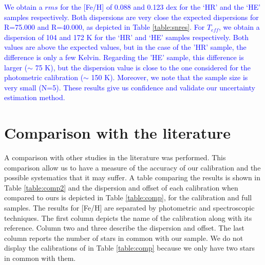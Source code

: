 \documentclass{aa}
\begin{document}
\textcolor{blue}{We obtain a $rms$ for the [Fe/H] of 0.088 and 0.123 dex for the `HR' and the `HE' samples respectively. Both dispersions are very close the expected dispersions for R=75.000 and R=40.000, as depicted in Table \ref{table:snres}. For $T_{eff}$, we obtain a dispersion of 104 and 172 K for the `HR' and `HE' samples respectively. Both values are above the expected values, but in the case of the 'HR' sample, the difference is only a few Kelvin. Regarding the 'HE' sample, this difference is larger ($\sim$ 75 K), but the dispersion value is close to the one considered for the photometric calibration ($\sim$ 150 K). Moreover, we note that the sample size is very small (N=5). These results give us confidence and validate our uncertainty estimation method.
}






\section{Comparison with the literature}
\label{sec:comp}
A comparison with other studies in the literature was performed. This comparison allow us to have a measure of the accuracy of our calibration and the possible systematics that it may suffer. A table comparing the results is shown in Table \ref{table:comp2} and  the dispersion and offset of each calibration when compared to ours is depicted in Table \ref{table:comp},  for the calibration and full samples. The results for [Fe/H] are separated by photometric and spectroscopic techniques. The first column depicts the name of the calibration along with its reference. Column two and three describe the dispersion and offset. The last column reports the number of stars in common with our sample. We do not display the calibrations of \citet{Mann-2013a} in Table \ref{table:comp} because we only have two stars in common with them. 
\end{document}
